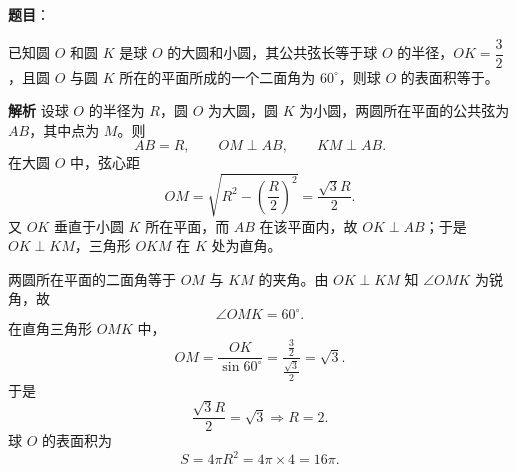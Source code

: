 \begin{answer}

\textbf{题目}：

已知圆 $O$ 和圆 $K$ 是球 $O$ 的大圆和小圆，其公共弦长等于球 $O$ 的半径，$OK=\dfrac32$，且圆 $O$ 与圆 $K$ 所在的平面所成的一个二面角为 $60^\circ$，则球 $O$ 的表面积等于\gkblank{}。

\textbf{解析}
设球 $O$ 的半径为 $R$，圆 $O$ 为大圆，圆 $K$ 为小圆，两圆所在平面的公共弦为 $AB$，其中点为 $M$。则
\nopagebreak[4]
\[AB=R,\qquad OM\perp AB,\qquad KM\perp AB.\]
在大圆 $O$ 中，弦心距
\nopagebreak[4]
\[OM=\sqrt{R^2-\left(\frac R2\right)^2}
=\frac{\sqrt3R}{2}.\]
又 $OK$ 垂直于小圆 $K$ 所在平面，而 $AB$ 在该平面内，故 $OK\perp AB$；于是 $OK\perp KM$，三角形 $OKM$ 在 $K$ 处为直角。

两圆所在平面的二面角等于 $OM$ 与 $KM$ 的夹角。由 $OK\perp KM$ 知 $\angle OMK$ 为锐角，故
\nopagebreak[4]
\[\angle OMK=60^\circ.\]
在直角三角形 $OMK$ 中，
\nopagebreak[4]
\[OM=\frac{OK}{\sin60^\circ}
=\frac{\frac32}{\frac{\sqrt3}{2}}=\sqrt3.\]
于是
\nopagebreak[4]
\[\frac{\sqrt3R}{2}=\sqrt3\Longrightarrow R=2.\]
球 $O$ 的表面积为
\nopagebreak[4]
\[S=4\pi R^2=4\pi\times4=16\pi.\]


\end{answer}
